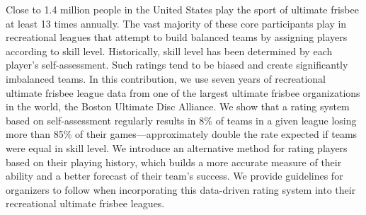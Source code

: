 Close to 1.4 million people in the United States play the sport of ultimate frisbee at least 13 times annually. The vast majority of these core participants play in recreational leagues that attempt to build balanced teams by assigning players according to skill level. Historically, skill level has been determined by each player’s self-assessment. Such ratings tend to be biased and create significantly imbalanced teams. In this contribution, we use seven years of recreational ultimate frisbee league data from one of the largest ultimate frisbee organizations in the world, the Boston Ultimate Disc Alliance. We show that a rating system based on self-assessment regularly results in 8\% of teams in a given league losing more than 85\% of their games---approximately double the rate expected if teams were equal in skill level. We introduce an alternative method for rating players based on their playing history, which builds a more accurate measure of their ability and a better forecast of their team’s success. We provide guidelines for organizers to follow when incorporating this data-driven rating system into their recreational ultimate frisbee leagues.